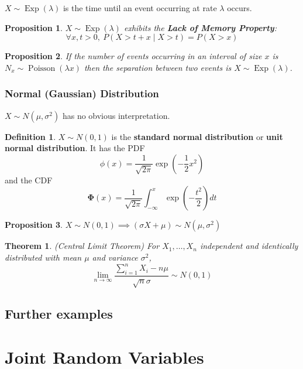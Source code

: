 \documentclass[12pt]{article}
\newtheorem{thm}{Theorem}[section]
\newtheorem*{prop*}{Proposition}
\theoremstyle{definition}
\newtheorem*{defn*}{Definition}
\newcommand{\stdnorm}{\mathbf{\Phi}}
\DeclareMathOperator{\Poisson}{Poisson}
\DeclareMathOperator{\Exp}{Exp}
\begin{document}
$X \sim \Exp(\lambda)$ is the time until an event occurring at rate $\lambda$ occurs.

\begin{prop*}
  $X \sim \Exp(\lambda)$ exhibits the \textbf{Lack of Memory Property}:
  $$\forall x, t > 0,\ P(X > t + x \mid X > t) = P(X > x)$$
\end{prop*}

\begin{prop*}
  If the number of events occurring in an interval of size $x$ is\\ $N_x \sim \Poisson(\lambda x)$ then the separation between two events is $X \sim \Exp(\lambda)$.
\end{prop*}

\subsubsection{Normal (Gaussian) Distribution}

$X \sim N(\mu, \sigma^2)$ has no obvious interpretation.

\begin{defn*}
  $X \sim N(0, 1)$ is the \textbf{standard normal distribution} or \textbf{unit normal distribution}.
  It has the PDF
  $$\phi(x) = \frac{1}{\sqrt{2\pi}}\exp\left(-\frac{1}{2}x^2\right)$$
  and the CDF
  $$\stdnorm(x) = \frac{1}{\sqrt{2\pi}}\int_{-\infty}^x\exp\left(-\frac{t^2}{2}\right)dt$$
\end{defn*}

\begin{prop*}
  $X \sim N(0, 1) \implies (\sigma X + \mu) \sim N(\mu, \sigma^2)$
\end{prop*}


\begin{thm}
  (Central Limit Theorem)
  For $X_1, \ldots, X_n$ independent and identically distributed with mean $\mu$ and variance $\sigma^2$,
  $$\lim_{n \to \infty}\frac{\sum_{i = 1}^nX_i - n\mu}{\sqrt{n}\sigma} \sim N(0, 1)$$
\end{thm}


\subsection{Further examples}

\section{Joint Random Variables}
\end{document}
